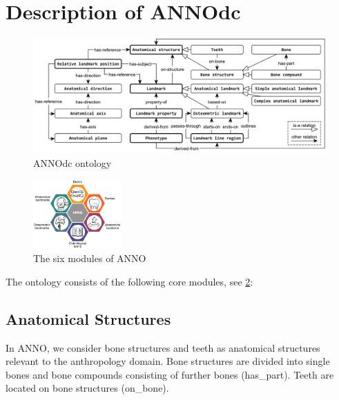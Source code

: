 \documentclass[sw]{iosart2x}
\begin{document}
\section{Description of ANNOdc}\label{sec:core}
\begin{figure}[h]
\includegraphics[width=\textwidth]{img/core.pdf}
\caption{ANNOdc ontology}\label{fig:core}
\end{figure}

\begin{figure}[h]
\includegraphics[width=0.3\textwidth]{img/modules.pdf}
\caption{The six modules of ANNO}\label{fig:modules}
\end{figure}

The ontology consists of the following core modules, see \cref{fig:modules}:
\subsection{Anatomical Structures}\label{sec:bone}

In ANNO, we consider bone structures and teeth as anatomical structures relevant to the anthropology domain.
Bone structures are divided into single bones and bone compounds consisting of further bones (has\_part).
Teeth are located on bone structures (on\_bone).
\end{document}
